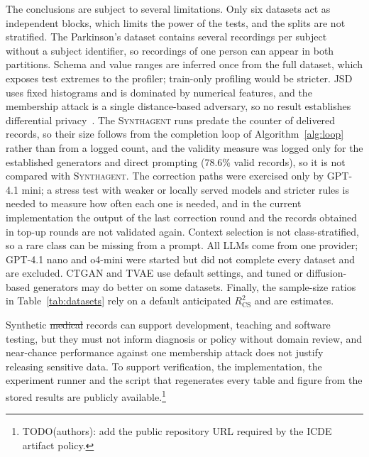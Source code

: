 \documentclass[conference]{IEEEtran}
\newcommand{\system}{\textsc{Synthagent}\xspace}
\providecommand{\DIFaddtex}[1]{{\protect\color{blue}\uwave{#1}}} %
\providecommand{\DIFdeltex}[1]{{\protect\color{red}\sout{#1}}}                      %
\providecommand{\DIFaddbegin}{} %
\providecommand{\DIFaddend}{} %
\providecommand{\DIFdelbegin}{} %
\providecommand{\DIFdelend}{} %
\providecommand{\DIFadd}[1]{\texorpdfstring{\DIFaddtex{#1}}{#1}} %
\providecommand{\DIFdel}[1]{\texorpdfstring{\DIFdeltex{#1}}{}} %
\newcommand{\DIFscaledelfig}{0.5}
\newlength{\DIFdelgraphicswidth} %
\newlength{\DIFdelgraphicsheight} %
\newcommand{\DIFaddincludegraphics}[2][]{{\color{blue}\fbox{\DIFOincludegraphics[#1]{#2}}}} %
\newcommand{\DIFdelincludegraphics}[2][]{%
\sbox{\DIFdelgraphicsbox}{\DIFOincludegraphics[#1]{#2}}%
\settoboxwidth{\DIFdelgraphicswidth}{\DIFdelgraphicsbox} %
\settoboxtotalheight{\DIFdelgraphicsheight}{\DIFdelgraphicsbox} %
\scalebox{\DIFscaledelfig}{%
\parbox[b]{\DIFdelgraphicswidth}{\usebox{\DIFdelgraphicsbox}\\[-\baselineskip] \rule{\DIFdelgraphicswidth}{0em}}\llap{\resizebox{\DIFdelgraphicswidth}{\DIFdelgraphicsheight}{%
\setlength{\unitlength}{\DIFdelgraphicswidth}%
\begin{picture}(1,1)%
\thicklines\linethickness{2pt} %
{\color[rgb]{1,0,0}\put(0,0){\framebox(1,1){}}}%
{\color[rgb]{1,0,0}\put(0,0){\line( 1,1){1}}}%
{\color[rgb]{1,0,0}\put(0,1){\line(1,-1){1}}}%
\end{picture}%
}\hspace*{3pt}}} %
} %
\DeclareRobustCommand{\DIFaddbegin}{\DIFOaddbegin \let\includegraphics\DIFaddincludegraphics} %
\DeclareRobustCommand{\DIFaddend}{\DIFOaddend \let\includegraphics\DIFOincludegraphics} %
\DeclareRobustCommand{\DIFdelbegin}{\DIFOdelbegin \let\includegraphics\DIFdelincludegraphics} %
\DeclareRobustCommand{\DIFdelend}{\DIFOaddend \let\includegraphics\DIFOincludegraphics} %
\begin{document}
The conclusions are subject to several limitations. Only six datasets act as independent blocks, which limits the power of the tests, and the splits are not stratified. The Parkinson's dataset contains several recordings per subject without a subject identifier, so recordings of one person can appear in both partitions. Schema and value ranges are inferred once from the full dataset, which exposes test extremes to the profiler; train-only profiling would be stricter. JSD uses fixed histograms and is dominated by numerical features, and the membership attack is a single distance-based adversary, so no result establishes differential privacy~\cite{dwork2014dp}. The \system runs predate the counter of delivered records, so their size follows from the completion loop of Algorithm~\ref{alg:loop} rather than from a logged count, and the validity measure was logged only for the established generators and direct prompting (78.6\% valid records), so it is not compared with \system. The correction paths were exercised only by GPT-4.1 mini; a stress test with weaker or locally served models and stricter rules is needed to measure how often each one is needed, and in the current implementation the output of the last correction round and the records obtained in top-up rounds are not validated again. Context selection is not class-stratified, so a rare class can be missing from a prompt. All LLMs come from one provider; GPT-4.1 nano and o4-mini were started but did not complete every dataset and are excluded. CTGAN and TVAE use default settings, and tuned or diffusion-based generators may do better on some datasets. Finally, the sample-size ratios in Table~\ref{tab:datasets} rely on a default anticipated $R^2_{\mathrm{CS}}$ and are estimates.

Synthetic \DIFdelbegin \DIFdel{medical }\DIFdelend \DIFaddbegin \DIFadd{healthcare }\DIFaddend records can support development, teaching and software testing, but they must not inform diagnosis or policy without domain review, and near-chance performance against one membership attack does not justify releasing sensitive data. To support verification, the implementation, the experiment runner and the script that regenerates every table and figure from the stored results are publicly available.\footnote{TODO(authors): add the public repository URL required by the ICDE artifact policy.}

\end{document}
